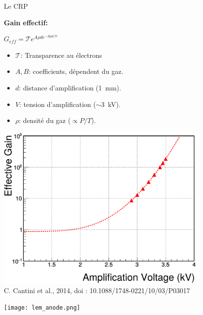     \begin{frame}{Le CRP}
   		\begin{minipage}{0.43\textwidth}
   			\begin{scriptsize}
	   			\textbf{Gain effectif:}\\
	   		\end{scriptsize}
   			$G_{eff} = \mathcal{T}e^{A\rho d e^{-B\rho d/V}}$\\
   			\begin{scriptsize}
    			\begin{itemize}
    				\item $\mathcal{T}$: Transparence au électrons
    				\item $A,B$: coefficients, dépendent du gaz.
    				\item $d$: distance d'amplification (\SI{1}{\milli\meter}).
    				\item $V$: tension d'amplification ($\sim$\SI{3}{\kilo\volt}).
    				\item $\rho$: densité du gaz ($\propto P/T$).
    			\end{itemize}
    		\end{scriptsize} 
   			\vfill\centering\includegraphics[width=0.8\textwidth]{./pictures/gain_3L.pdf}\\\tiny{C. Cantini et al., 2014, doi : 10.1088/1748-0221/10/03/P03017}
   		\end{minipage}\hfill
   		\begin{minipage}{0.52\textwidth}
   			\texttt{[image: lem\_anode.png]}
   		\end{minipage}
    \end{frame}
    
